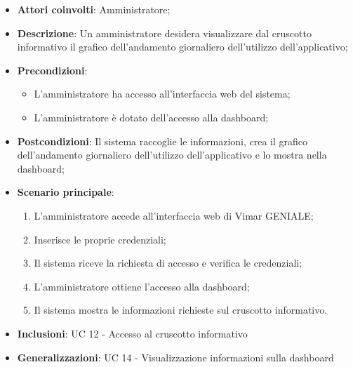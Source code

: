 \begin{itemize}
    \item \textbf{Attori coinvolti}: Amministratore;
    \item \textbf{Descrizione}: Un amministratore desidera visualizzare dal cruscotto informativo il grafico dell’andamento giornaliero dell’utilizzo dell’applicativo;
    \item \textbf{Precondizioni}: 
        \begin{itemize}
            \item L’amministratore ha accesso all’interfaccia web del sistema;
            \item L’amministratore è dotato dell’accesso alla dashboard;
        \end{itemize}
    \item \textbf{Postcondizioni}: Il sistema raccoglie le informazioni, crea il grafico dell’andamento giornaliero dell’utilizzo dell’applicativo e lo mostra nella dashboard;
    \item \textbf{Scenario principale}:
    \begin{enumerate}
    \item L’amministratore accede all’interfaccia web di Vimar GENIALE;
    \item Inserisce le proprie credenziali;
    \item Il sistema riceve la richiesta di accesso e verifica le credenziali;
    \item L’amministratore ottiene l’accesso alla dashboard;
    \item Il sistema mostra le informazioni richieste sul cruscotto informativo.
    \end{enumerate}
    \item \textbf{Inclusioni}: UC 12 - Accesso al cruscotto informativo
    \item \textbf{Generalizzazioni}: UC 14 - Visualizzazione informazioni sulla dashboard
\end{itemize}

